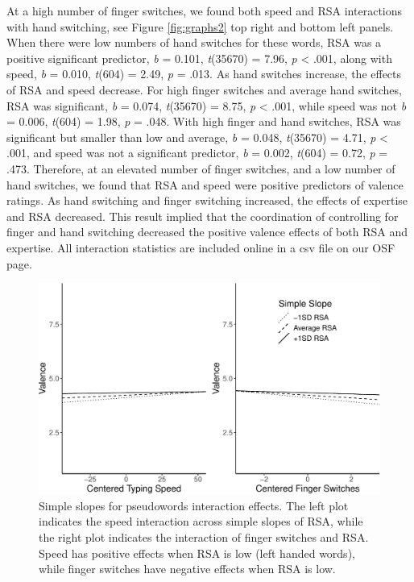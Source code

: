 \documentclass[
  english,
  man]{apa7}
\begin{document}
At a high number of finger switches, we found both speed and RSA interactions with hand switching, see Figure \ref{fig:graphs2} top right and bottom left panels. When there were low numbers of hand switches for these words, RSA was a positive significant predictor, \emph{b} = 0.101, \emph{t}(35670) = 7.96, \emph{p} \textless{} .001, along with speed, \emph{b} = 0.010, \emph{t}(604) = 2.49, \emph{p} = .013. As hand switches increase, the effects of RSA and speed decrease. For high finger switches and average hand switches, RSA was significant, \emph{b} = 0.074, \emph{t}(35670) = 8.75, \emph{p} \textless{} .001, while speed was not \emph{b} = 0.006, \emph{t}(604) = 1.98, \emph{p} = .048. With high finger and hand switches, RSA was significant but smaller than low and average, \emph{b} = 0.048, \emph{t}(35670) = 4.71, \emph{p} \textless{} .001, and speed was not a significant predictor, \emph{b} = 0.002, \emph{t}(604) = 0.72, \emph{p} = .473. Therefore, at an elevated number of finger switches, and a low number of hand switches, we found that RSA and speed were positive predictors of valence ratings. As hand switching and finger switching increased, the effects of expertise and RSA decreased. This result implied that the coordination of controlling for finger and hand switching decreased the positive valence effects of both RSA and expertise. All interaction statistics are included online in a csv file on our OSF page.

\begin{figure}
\centering
\includegraphics{QWERTY_files/figure-latex/graphs-1.pdf}
\caption{\label{fig:graphs}Simple slopes for pseudowords interaction effects. The left plot indicates the speed interaction across simple slopes of RSA, while the right plot indicates the interaction of finger switches and RSA. Speed has positive effects when RSA is low (left handed words), while finger switches have negative effects when RSA is low.}
\end{figure}
\end{document}
